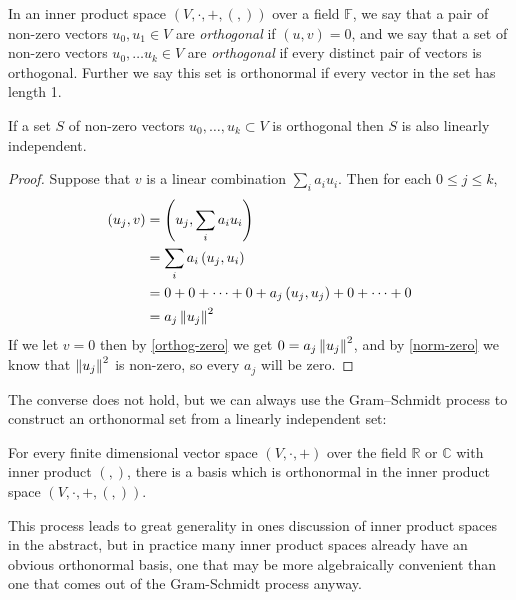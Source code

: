 \begin{define}
	In an inner product space $(V, \cdot, +, (,))$ over a field $\mathbb{F}$, we say that a pair of non-zero vectors $u_0, u_1 \in V$ are \emph{orthogonal} if $(u,v) = 0$, and we say that a set of non-zero vectors $u_0, \dots u_k \in V$ are \emph{orthogonal} if every distinct pair of vectors is orthogonal. Further we say this set is orthonormal if every vector in the set has length 1.
\end{define}

\begin{prop}\label{orthog-independent}
	If a set $S$ of non-zero vectors $u_0,\dots,u_k \subset V$ is orthogonal then $S$ is also linearly independent.
\end{prop}
\begin{proof}
	Suppose that $v$ is a linear combination $\sum_i a_iu_i$. Then for each $0 \leq j \leq k$,
	\begin{align*}
		(u_j,v)
		&= \left(u_j,\sum_i a_iu_i\right)
		\\&= \sum_i a_i\left(u_j,u_i\right)
		\\&= 0 + 0 + \dots + 0 + a_j\left(u_j,u_j\right) + 0 + \dots + 0
		\\&= a_j\left\Vert u_j \right\Vert^2
	\end{align*}
	If we let $v = 0$ then by \autoref{orthog-zero} we get $0 = a_j\left\Vert u_j \right\Vert^2$, and by \autoref{norm-zero} we know that $\left\Vert u_j \right\Vert^2$ is non-zero, so every $a_j$ will be zero.
\end{proof}

The converse does not hold, but we can always use the Gram–Schmidt process to construct an orthonormal set from a linearly independent set:

\begin{prop}
	For every finite dimensional vector space $(V, \cdot, +)$ over the field $\mathbb{R}$ or $\mathbb{C}$ with inner product $(,)$, there is a basis which is orthonormal in the inner product space $(V, \cdot, +, (,))$.
\end{prop}
This process leads to great generality in ones discussion of inner product spaces in the abstract, but in practice many inner product spaces already have an obvious orthonormal basis, one that may be more algebraically convenient than one that comes out of the Gram-Schmidt process anyway.

